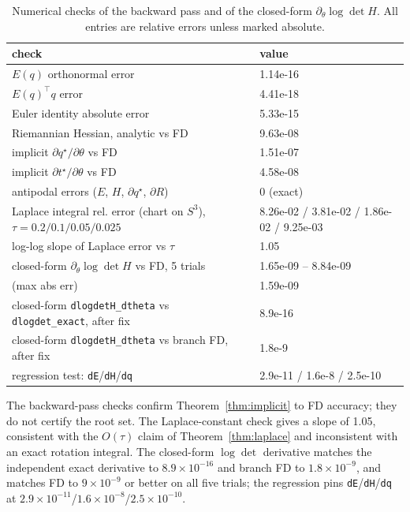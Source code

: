 \begin{table}[t]
\centering
\caption{Numerical checks of the backward pass and of the closed-form $\partial_\theta\log\det H$. All entries are relative errors unless marked absolute.}
\label{tab:backward}
\scriptsize
\setlength{\tabcolsep}{3pt}
\begin{tabular}{@{}p{3.85cm} p{3.9cm}@{}}
\toprule
check & value\\
\midrule
$E(q)$ orthonormal error & 1.14e-16\\
$E(q)^\top q$ error & 4.41e-18\\
Euler identity absolute error & 5.33e-15\\
Riemannian Hessian, analytic vs FD & 9.63e-08\\
implicit $\partial q^\star/\partial\theta$ vs FD & 1.51e-07\\
implicit $\partial t^\star/\partial\theta$ vs FD & 4.58e-08\\
antipodal errors ($E$, $H$, $\partial q^\star$, $\partial R$) & 0 (exact)\\
Laplace integral rel. error (chart on $S^3$), $\tau=0.2/0.1/0.05/0.025$ & 8.26e-02 / 3.81e-02 / 1.86e-02 / 9.25e-03\\
log-log slope of Laplace error vs $\tau$ & 1.05\\
closed-form $\partial_\theta\log\det H$ vs FD, 5 trials & 1.65e-09 -- 8.84e-09\\
\quad (max abs err) & 1.59e-09\\
closed-form \texttt{dlogdetH\_dtheta} vs \texttt{dlogdet\_exact}, after fix & 8.9e-16\\
closed-form \texttt{dlogdetH\_dtheta} vs branch FD, after fix & 1.8e-9\\
regression test: \texttt{dE}/\texttt{dH}/\texttt{dq} & 2.9e-11 / 1.6e-8 / 2.5e-10\\
\bottomrule
\end{tabular}
\end{table}

The backward-pass checks confirm Theorem~\ref{thm:implicit} to FD accuracy; they do not certify the root set. The Laplace-constant check gives a slope of 1.05, consistent with the $O(\tau)$ claim of Theorem~\ref{thm:laplace} and inconsistent with an exact rotation integral. The closed-form $\log\det$ derivative matches the independent exact derivative to $8.9\times10^{-16}$ and branch FD to $1.8\times10^{-9}$, and matches FD to $9\times10^{-9}$ or better on all five trials; the regression pins \texttt{dE}/\texttt{dH}/\texttt{dq} at $2.9\times10^{-11}$/$1.6\times10^{-8}$/$2.5\times10^{-10}$.

